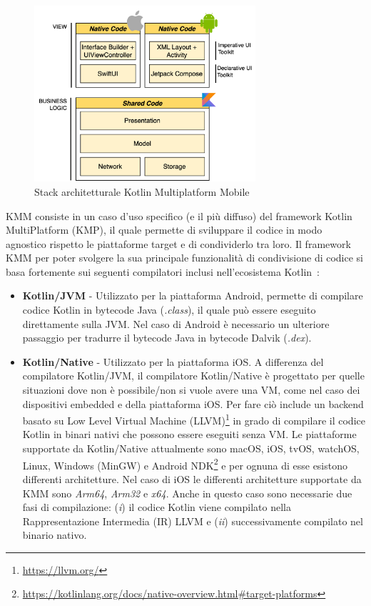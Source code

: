 \begin{figure}[H]
    \centering
    \includegraphics[width=0.73\textwidth]{img/stack_kmm.png}
    \caption{Stack architetturale Kotlin Multiplatform Mobile}
    \label{stackKMM}
\end{figure}

KMM consiste in un caso d'uso specifico (e il più diffuso) del framework Kotlin MultiPlatform (KMP),
il quale permette di sviluppare il codice in modo agnostico rispetto le piattaforme target e di condividerlo tra loro. 
Il framework KMM per poter svolgere la sua principale funzionalità di condivisione di codice si basa fortemente sui seguenti compilatori inclusi nell'ecosistema Kotlin~\cite{nagy2022simplifying}:

\begin{itemize}
    \item \textbf{Kotlin/JVM} - Utilizzato per la piattaforma Android, permette di compilare codice Kotlin in bytecode Java (\textit{.class}), il quale può essere eseguito direttamente sulla JVM. Nel caso di Android è necessario un ulteriore passaggio per tradurre il bytecode Java in bytecode Dalvik (\textit{.dex}).

    \item \textbf{Kotlin/Native} - Utilizzato per la piattaforma iOS. A differenza del compilatore Kotlin/JVM, il compilatore Kotlin/Native è progettato per quelle situazioni dove non è possibile/non si vuole avere una VM, come nel caso dei dispositivi embedded e della piattaforma iOS. Per fare ciò include un backend basato su Low Level Virtual Machine (LLVM)\footnote{\href{https://llvm.org/}{https://llvm.org/}} in grado di compilare il codice Kotlin in binari nativi che possono essere eseguiti senza VM\cite{nagy2022simplifying}. Le piattaforme supportate da Kotlin/Native attualmente sono macOS, iOS, tvOS, watchOS, Linux, Windows (MinGW) e Android NDK\footnote{\href{https://kotlinlang.org/docs/native-overview.html\#target-platforms}{https://kotlinlang.org/docs/native-overview.html\#target-platforms}} e per ognuna di esse esistono differenti architetture. Nel caso di iOS le differenti architetture supportate da KMM sono \textit{Arm64}, \textit{Arm32} e \textit{x64}. Anche in questo caso sono necessarie due fasi di compilazione: (\textit{i}) il codice Kotlin viene compilato nella Rappresentazione Intermedia (IR) LLVM e (\textit{ii}) successivamente compilato nel binario nativo.
\end{itemize}

